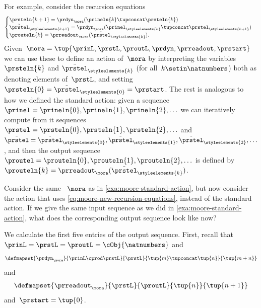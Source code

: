 {For example, consider the recursion equations
\begin{equation}
    \label{eq:moore-new-recursion-equations}
    \begin{cases}
        \prsteln{k+1} = \prdyn_\mora(\prineln{k} \tupconcat \prsteln{k})                                                           \\
        \tilde{\prstel}_{\styleelements{k+1}} = \prdyn_\mora(\prinel_{\styleelements{k}} \tupconcat \prstel_{\styleelements{k+1}}) \\
        \prouteln{k} = \prreadout_\mora(\tilde{\prstel}_{\styleelements{k}}).
    \end{cases}
\end{equation}
Given~$\mora = \tup{\prinL,\prstL,\proutL,\prdyn,\prreadout,\prstart}$ we can use these to define an action of~$\mora$ by interpreting the variables~$\prsteln{k}$ and $\tilde{\prstel}_\styleelements{k}$ (for all~$k \setin \natnumbers$) both as denoting elements of~$\prstL$, and setting~$\prsteln{0} = \tilde{\prstel}_\styleelements{0} = \prstart$.
The rest is analogous to how we defined the standard action:
given a sequence~$\prinel = \prineln{0}, \prineln{1}, \prineln{2}, \ldots$ we can iteratively compute from it sequences~$\prstel = \prsteln{0}, \prsteln{1}, \prsteln{2}, \ldots$ and~$\tilde \prstel = \tilde{\prstel}_\styleelements{0}, \tilde{\prstel}_\styleelements{1}, \tilde{\prstel}_\styleelements{2}, \ldots$, and then the output sequence~$\proutel = \prouteln{0}, \prouteln{1}, \prouteln{2}, \ldots$ is defined by~$\prouteln{k} = \prreadout_\mora(\tilde{\prstel}_{\styleelements{k}})$.

\begin{example}
    \label{exa:moore-non-standard-action-on-sequences}
    Consider the same ~$\mora$ as in \cref{exa:moore-standard-action}, but now consider the action that uses \cref{eq:moore-new-recursion-equations}, instead of the standard action.
    If we give the same input sequence as we did in \cref{exa:moore-standard-action}, what does the corresponding output sequence look like now?

    We calculate the first five entries of the output sequence.
    First, recall that~$\prinL = \prstL = \proutL = \cObj{\natnumbers}$ and
    \begin{equation}
        \defmapset{
            \prdyn_\mora
        }{
            \prinL \cprod \prstL
        }{
            \prstL
        }{
            \tup{m} \tupconcat \tup{n}
        }{
            \tup{m + n}
        }
    \end{equation}
    and
    \begin{equation}
        \defmapset{
            \prreadout_\mora
        }{
            \prstL
        }{
            \proutL
        }{
            \tup{n}
        }{
            \tup{n+1}
        }
    \end{equation}
    and~$\prstart = \tup{0}$.


\end{example}}

